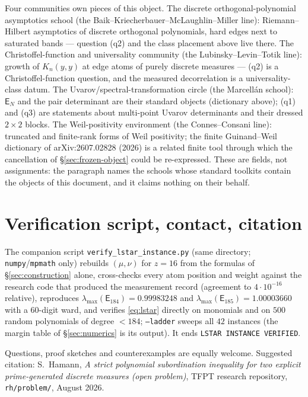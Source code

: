 \documentclass[11pt]{article}
\theoremstyle{remark}
\newcommand{\E}{\mathsf{E}}
\begin{document}
Four communities own pieces of this object.  The discrete
orthogonal-polynomial asymptotics school (the
Baik--Kriecherbauer--McLaughlin--Miller line): Riemann--Hilbert
asymptotics of discrete orthogonal polynomials, hard edges next
to saturated bands --- question (q2) and the class placement
above live there.  The Christoffel-function and universality
community (the Lubinsky--Levin--Totik line): growth of
$K_{n}(y,y)$ at edge atoms of purely discrete measures --- (q2)
is a Christoffel-function question, and the measured
decorrelation is a universality-class datum.  The
Uvarov/spectral-transformation circle (the Marcell\'an school):
$\E_{N}$ and the pair determinant are their standard objects
(dictionary above); (q1) and (q3) are statements about
multi-point Uvarov determinants and their dressed $2\times2$
blocks.  The Weil-positivity environment (the Connes--Consani
line): truncated and finite-rank forms of Weil positivity; the
finite Guinand--Weil dictionary of arXiv:2607.02828 (2026) is a
related finite tool through which the cancellation of
\S\ref{sec:frozen-object} could be re-expressed.  These are
fields, not assignments: the paragraph names the schools whose
standard toolkits contain the objects of this document, and it
claims nothing on their behalf.

\section{Verification script, contact, citation}\label{sec:script}

The companion script \texttt{verify\_lstar\_instance.py} (same
directory; \texttt{numpy}/\texttt{mpmath} only) rebuilds
$(\mu,\nu)$ for $z=16$ from the formulas of
\S\ref{sec:construction} alone, cross-checks every atom position and
weight against the research code that produced the measurement record
(agreement to $4\cdot10^{-16}$ relative), reproduces
$\lambda_{\max}(\E_{184})=0.99983248$ and
$\lambda_{\max}(\E_{185})=1.00003660$ with a $60$-digit ward, and
verifies \eqref{eq:lstar} directly on monomials and on $500$ random
polynomials of degree $<184$; \texttt{--ladder} sweeps all $42$
instances (the margin table of \S\ref{sec:numerics} is its output).
It ends \texttt{LSTAR INSTANCE VERIFIED}.

\medskip\noindent
Questions, proof sketches and counterexamples are equally welcome.
Suggested citation: S.~Hamann, \emph{A strict polynomial
subordination inequality for two explicit prime-generated discrete
measures (open problem)}, TFPT research repository,
\texttt{rh/problem/}, August 2026.
\end{document}
